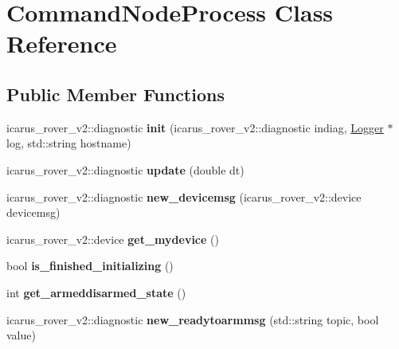\hypertarget{classCommandNodeProcess}{}\section{Command\+Node\+Process Class Reference}
\label{classCommandNodeProcess}
\subsection*{Public Member Functions}
\begin{DoxyCompactItemize}
\item 
\mbox{\label{classCommandNodeProcess_ae6c1db7629ef5625478d4ec6c69e9b85}} 
icarus\+\_\+rover\+\_\+v2\+::diagnostic {\bfseries init} (icarus\+\_\+rover\+\_\+v2\+::diagnostic indiag, \hyperlink{classLogger}{Logger} $\ast$log, std\+::string hostname)
\item 
\mbox{\label{classCommandNodeProcess_a219f1b6084e014d97a7dbe3ed3a8723c}} 
icarus\+\_\+rover\+\_\+v2\+::diagnostic {\bfseries update} (double dt)
\item 
\mbox{\label{classCommandNodeProcess_ae804e83d16d2067b997fb7d045b13873}} 
icarus\+\_\+rover\+\_\+v2\+::diagnostic {\bfseries new\+\_\+devicemsg} (icarus\+\_\+rover\+\_\+v2\+::device devicemsg)
\item 
\mbox{\label{classCommandNodeProcess_a1f8660174905dd6860d6e37d450eac9a}} 
icarus\+\_\+rover\+\_\+v2\+::device {\bfseries get\+\_\+mydevice} ()
\item 
\mbox{\label{classCommandNodeProcess_ab29868096685e03e2162aba300be0a41}} 
bool {\bfseries is\+\_\+finished\+\_\+initializing} ()
\item 
\mbox{\label{classCommandNodeProcess_a5a084f96c28f3036357686530f94845e}} 
int {\bfseries get\+\_\+armeddisarmed\+\_\+state} ()
\item 
\mbox{\label{classCommandNodeProcess_a4dac2cc9b73fd2fb5483b765ec1e344e}} 
icarus\+\_\+rover\+\_\+v2\+::diagnostic {\bfseries new\+\_\+readytoarmmsg} (std\+::string topic, bool value)
\item 

\end{DoxyCompactItemize}
